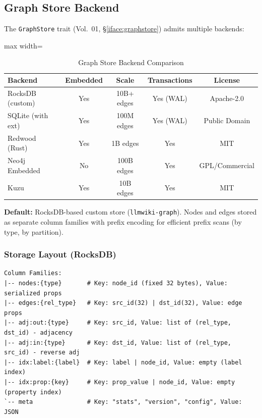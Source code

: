 \subsection{Graph Store Backend}
\label{sec:kg:store}

The \texttt{GraphStore} trait (Vol.~01, \S\ref{iface:graphstore}) admits multiple backends:

\begin{table}[htbp]
\centering
\caption{Graph Store Backend Comparison}
\label{tab:kg:backends}
\begin{adjustbox}{max width=\textwidth}
\begin{tabular}{lcccc}
\toprule
\textbf{Backend} & \textbf{Embedded} & \textbf{Scale} & \textbf{Transactions} & \textbf{License} \\
\midrule
RocksDB (custom) & Yes & 10B+ edges & Yes (WAL) & Apache-2.0 \\
SQLite (with ext) & Yes & 100M edges & Yes (WAL) & Public Domain \\
Redwood (Rust) & Yes & 1B edges & Yes & MIT \\
Neo4j Embedded & No & 100B edges & Yes & GPL/Commercial \\
Kuzu & Yes & 10B edges & Yes & MIT \\
\bottomrule
\end{tabular}
\end{adjustbox}
\end{table}

\textbf{Default:} RocksDB-based custom store (\texttt{llmwiki-graph}). Nodes and edges stored as separate column families with prefix encoding for efficient prefix scans (by type, by partition).

\subsubsection{Storage Layout (RocksDB)}
\label{sec:kg:rocksdb-layout}

\begin{verbatim}
Column Families:
|-- nodes:{type}       # Key: node_id (fixed 32 bytes), Value: serialized props
|-- edges:{rel_type}   # Key: src_id(32) | dst_id(32), Value: edge props
|-- adj:out:{type}     # Key: src_id, Value: list of (rel_type, dst_id) - adjacency
|-- adj:in:{type}      # Key: dst_id, Value: list of (rel_type, src_id) - reverse adj
|-- idx:label:{label}  # Key: label | node_id, Value: empty (label index)
|-- idx:prop:{key}     # Key: prop_value | node_id, Value: empty (property index)
`-- meta               # Key: "stats", "version", "config", Value: JSON
\end{verbatim}

